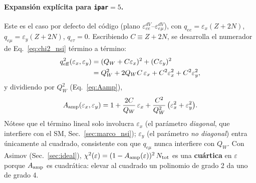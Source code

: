 \documentclass[11pt,a4paper]{article}
\newcommand{\eps}{\varepsilon}
\newcommand{\QW}{Q_{W}}
\newcommand{\qeff}{q_{\rm eff}}
\newcommand{\Aamp}{A_{\rm amp}}
\newcommand{\code}[1]{\texttt{#1}}
\begin{document}
\paragraph{Expansi\'on expl\'icita para \code{ipar}$=5$.} Este es el caso
por defecto del c\'odigo (plano $\eps_{ee}^{dV}$--$\eps_{e\mu}^{dV}$), con
$q_{ee}=\eps_{x}(Z+2N)$, $q_{e\mu}=\eps_{y}(Z+2N)$, $q_{e\tau}=0$. Escribiendo
$C\equiv Z+2N$, se desarrolla el numerador de Eq.~\eqref{eq:chi2_nsi} t\'ermino a
t\'ermino:
\begin{align}
  \qeff^{2}(\eps_{x},\eps_{y})
  &= (\QW + C\eps_{x})^{2} + (C\eps_{y})^{2}\notag\\
  &= \QW^{2} + 2\QW C\,\eps_{x} + C^{2}\eps_{x}^{2} + C^{2}\eps_{y}^{2},
  \label{eq:qeff2_expand_5}
\end{align}
y dividiendo por $\QW^{2}$ (Eq.~\eqref{eq:Aamp}),
\begin{equation}
  \label{eq:Aamp_quart}
  \Aamp(\eps_{x},\eps_{y})
  = 1
  + \frac{2C}{\QW}\,\eps_{x}
  + \frac{C^{2}}{\QW^{2}}\,\bigl(\eps_{x}^{2} + \eps_{y}^{2}\bigr).
\end{equation}
N\'otese que el t\'ermino lineal solo involucra $\eps_{x}$ (el par\'ametro
\emph{diagonal}, que interfiere con el SM, Sec.~\ref{sec:marco_nsi});
$\eps_{y}$ (el par\'ametro \emph{no diagonal}) entra \'unicamente al cuadrado,
consistente con que $q_{e\mu}$ nunca interfiere con $\QW$. Con Asimov
(Sec.~\ref{sec:ideal}), $\chi^{2}(\eps) = (1-\Aamp(\eps))^{2}\, N_{\rm tot}$ es
una \textbf{cu\'artica} en $\eps$ porque $\Aamp$ es cuadr\'atica: elevar al
cuadrado un polinomio de grado 2 da uno de grado 4.
\end{document}
